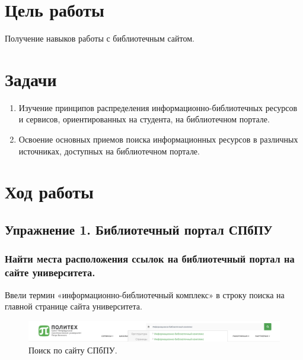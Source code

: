 \documentclass[14pt,a4paper,report]{report}
\begin{document}
\section{Цель работы}

Получение навыков работы с библиотечным сайтом.

\section{Задачи}

\begin{enumerate}
	
	\item Изучение принципов распределения информационно-библиотечных ресурсов и сервисов, ориентированных на студента, на библиотечном портале.
	
	\item Освоение основных приемов поиска информационных ресурсов в различных источниках, доступных на библиотечном портале.
	
\end{enumerate}

\clearpage

\section{Ход работы}

\subsection{Упражнение 1. Библиотечный портал СПбПУ}

\subsubsection{Найти места расположения ссылок на библиотечный портал на сайте университета.}

Ввели термин «информационно-библиотечный комплекс» в строку поиска на главной странице сайта университета.

\begin{figure}[h!]
\centering
\includegraphics[scale = 0.33]{111.png}
\caption{Поиск по сайту СПбПУ.}
\label{image:1}
\end{figure}
\end{document}
